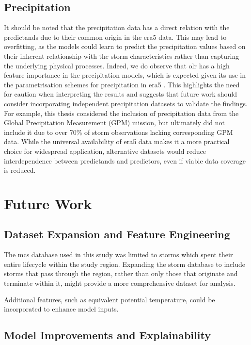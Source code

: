 \subsection{Precipitation}

It should be noted that the precipitation data has a direct relation with the predictands due to their common origin in the \acrshort{era5} data. This may lead to overfitting, as the models could learn to predict the precipitation values based on their inherent relationship with the storm characteristics rather than capturing the underlying physical processes. Indeed, we do observe that \acrshort{olr} has a high feature importance in the precipitation models, which is expected given its use in the parametrisation schemes for precipitation in \acrshort{era5} \citep{Hersbach2020}. This highlights the need for caution when interpreting the results and suggests that future work should consider incorporating independent precipitation datasets to validate the findings. For example, this thesis considered the inclusion of precipitation data from the Global Precipitation Measurement (GPM) mission, but ultimately did not include it due to over 70\% of storm observations lacking corresponding GPM data. While the universal availability of \acrshort{era5} data makes it a more practical choice for widespread application, alternative datasets would reduce interdependence between predictands and predictors, even if viable data coverage is reduced.

\section{Future Work}

\subsection{Dataset Expansion and Feature Engineering}

The \acrshort{mcs} database used in this study was limited to storms which spent their entire lifecycle within the study region. Expanding the storm database to include storms that pass through the region, rather than only those that originate and terminate within it, might provide a more comprehensive dataset for analysis. 

Additional features, such as equivalent potential temperature, could be incorporated to enhance model inputs.

\subsection{Model Improvements and Explainability}

